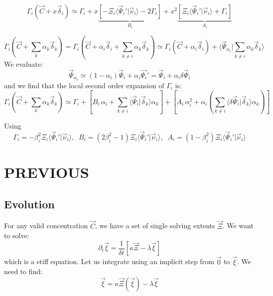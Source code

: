 \documentclass[aps,12pt]{revtex4}
\begin{document}
\begin{equation}
	\Gamma_i(\vec{C} + x \vec{\delta}_i) \simeq \Gamma_i 
	+ x \underbrace{\left[ -\Xi_i \langle \vec{\Psi}_i' \vert \vec{\nu}_i \rangle - 2 \Gamma_i \right]}_{B_i}
	+ x^2 \underbrace{\left[ \Xi_i \langle \vec{\Psi}_i' \vert \vec{\nu}_i \rangle + \Gamma_i\right]}_{A_i}
\end{equation}

\begin{equation}
	\Gamma_i(\vec{C} + \sum_k \alpha_k \vec{\delta}_k ) 
	=
	\Gamma_i \left(\vec{C} + \alpha_i \vec{\delta}_i + \sum_{k\not=i} \alpha_k \vec{\delta}_k \right)
	\simeq
	\Gamma_i(\vec{C}+\alpha_i \vec{\delta}_i) + \langle \vec{\Psi}_{\alpha_i} \vert \sum_{k\not=i} \alpha_k \vec{\delta}_k \rangle
\end{equation}
We evaluate:
\begin{equation}
	\vec{\Psi}_{\alpha_i} \simeq (1-\alpha_i) \vec{\Psi}_i + \alpha_i \vec{\Psi_i}' = \vec{\Psi}_i + \alpha_i \delta\vec{\Psi}_i
\end{equation}
and we find that the local second order expansion of $\Gamma_i$ is:
\begin{equation}
	\Gamma_i(\vec{C} + \sum_k \alpha_k \vec{\delta}_k ) 
	\simeq
	\Gamma_i +
	\left[ 
	 B_i \, \alpha_i + \sum_{k\not=i} \langle \vec{\Psi}_i \vert \vec{\delta}_k \rangle \alpha_k
	\right]
	+ \left[ A_i \, \alpha_i^2 + \alpha_i \left( \sum_{k\not=i} \langle \delta\vec{\Psi}_i \vert \vec{\delta}_k \rangle \alpha_k \right) \right]
\end{equation}

Using 
\begin{equation}
	\Gamma_i = -\beta_i^2 \Xi_i \langle \vec{\Psi}_i' \vert \vec{\nu}_i \rangle,
	\;\;B_i = (2\beta_i^2-1) \Xi_i \langle \vec{\Psi}_i' \vert \vec{\nu}_i \rangle,
	\;\;A_i = (1-\beta_i^2) \Xi_i \langle \vec{\Psi}_i' \vert \vec{\nu}_i \rangle
\end{equation}



\section{PREVIOUS}

\subsection{Evolution}

For any valid concentration $\vec{C}$, we have a set of single solving extents $\vec{\Xi}$.
We want to solve:
\begin{equation}
	\partial_t \vec{\xi} = \dfrac{1}{\delta t} \left[ \kappa \vec{\Xi} - \lambda \vec{\xi} \right]
\end{equation}
which is a stiff equation. Let us integrate using an implicit step from $\vec{0}$ to $\vec{\xi}$.
We need to find:
\begin{equation}
	\vec{\xi} = \kappa \vec{\Xi}(\vec{\xi}) - \lambda \vec{\xi}
\end{equation}
\end{document}
